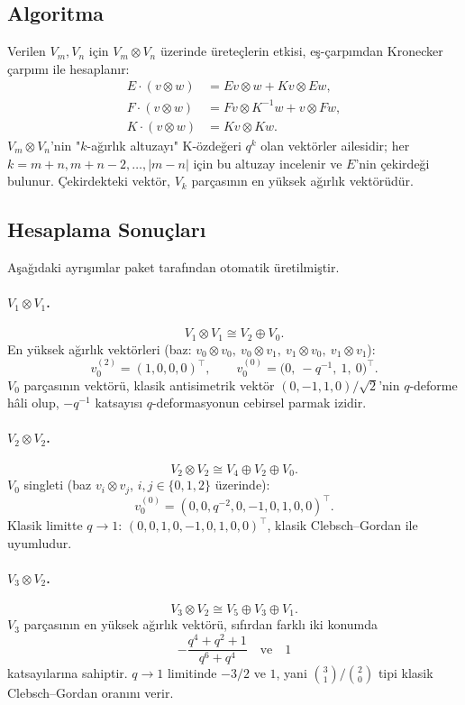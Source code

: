 \documentclass[10pt]{math}
\numberwithin{equation}{section}
\theoremstyle{plain}
\theoremstyle{definition}
\newcommand{\hwt}{v_0}
\begin{document}
\subsection{Algoritma}

Verilen $V_m, V_n$ için $V_m \otimes V_n$ üzerinde üreteçlerin etkisi,
eş-çarpımdan Kronecker çarpımı ile hesaplanır:
\begin{align*}
  E \cdot (v \otimes w) &= E v \otimes w + K v \otimes E w, \\
  F \cdot (v \otimes w) &= F v \otimes K^{-1} w + v \otimes F w, \\
  K \cdot (v \otimes w) &= K v \otimes K w.
\end{align*}
$V_m \otimes V_n$'nin "$k$-ağırlık altuzayı" K-özdeğeri $q^k$ olan
vektörler ailesidir; her $k = m+n, m+n-2, \dots, |m-n|$ için bu altuzay
incelenir ve $E$'nin çekirdeği bulunur. Çekirdekteki vektör, $V_k$
parçasının en yüksek ağırlık vektörüdür.

\subsection{Hesaplama Sonuçları}

Aşağıdaki ayrışımlar paket tarafından otomatik üretilmiştir.

\paragraph{$V_1 \otimes V_1$.}
\[
  V_1 \otimes V_1 \cong V_2 \oplus V_0.
\]
En yüksek ağırlık vektörleri (baz: $v_0\!\otimes\! v_0,\ v_0\!\otimes\! v_1,\ v_1\!\otimes\! v_0,\ v_1\!\otimes\! v_1$):
\[
  \hwt^{(2)} = (1, 0, 0, 0)^\top, \qquad
  \hwt^{(0)} = \big(0,\ -q^{-1},\ 1,\ 0\big)^\top.
\]
$V_0$ parçasının vektörü, klasik antisimetrik vektör
$(0, -1, 1, 0)/\sqrt{2}$'nin $q$-deforme hâli olup, $-q^{-1}$ katsayısı
$q$-deformasyonun cebirsel parmak izidir.

\paragraph{$V_2 \otimes V_2$.}
\[
  V_2 \otimes V_2 \cong V_4 \oplus V_2 \oplus V_0.
\]
$V_0$ singleti (baz $v_i \otimes v_j$, $i,j \in \{0,1,2\}$ üzerinde):
\[
  \hwt^{(0)} = (0, 0, q^{-2}, 0, -1, 0, 1, 0, 0)^\top.
\]
Klasik limitte $q \to 1$: $(0,0,1,0,-1,0,1,0,0)^\top$, klasik
Clebsch--Gordan ile uyumludur.

\paragraph{$V_3 \otimes V_2$.}
\[
  V_3 \otimes V_2 \cong V_5 \oplus V_3 \oplus V_1.
\]
$V_3$ parçasının en yüksek ağırlık vektörü, sıfırdan farklı iki konumda
\[
  -\frac{q^4 + q^2 + 1}{q^6 + q^4} \quad\text{ve}\quad 1
\]
katsayılarına sahiptir. $q \to 1$ limitinde $-3/2$ ve $1$, yani
$\binom{3}{1}/\binom{2}{0}$ tipi klasik Clebsch--Gordan oranını verir.
\end{document}
